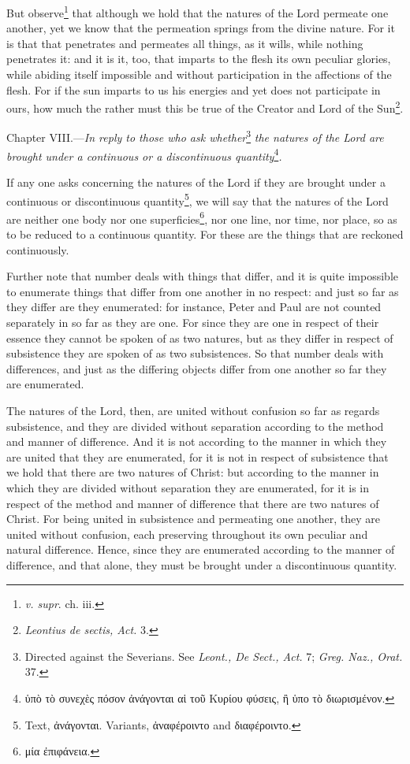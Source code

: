 But observe\footnote{\emph{v. supr}. ch. iii.} that although we hold that the natures of the Lord permeate one another, yet we know that the permeation springs from the divine nature. For it is that that penetrates and permeates all things, as it wills, while nothing penetrates it: and it is it, too, that imparts to the flesh its own peculiar glories, while abiding itself impossible and without participation in the affections of the flesh. For if the sun imparts to us his energies and yet does not participate in ours, how much the rather must this be true of the Creator and Lord of the Sun\footnote{\emph{Leontius de sectis, Act. }3.}.


Chapter VIII.—\emph{In reply to those who ask whether}\footnote{Directed against the Severians. See \emph{Leont., De Sect., Act. }7; \emph{Greg. Naz., Orat. }37.}\emph{ the natures of the Lord are brought under a continuous or a discontinuous quantity}\footnote{\textgreek{ὑπὸ τὸ συνεχὲς πόσον ἀνάγονται αἱ τοῦ Κυρίου φύσεις, ἢ ὑπο τὸ διωρισμένον}.}\emph{.}

If any one asks concerning the natures of the Lord if they are brought under a continuous or discontinuous quantity\footnote{Text, \textgreek{ἀνάγονται}. Variants, \textgreek{ἀναφέροιντο} and \textgreek{διαφέροιντο}.}, we will say that the natures of the Lord are neither one body nor one superficies\footnote{\textgreek{μία ἐπιφάνεια}.}, nor one line, nor time, nor place, so as to be reduced to a continuous quantity. For these are the things that are reckoned continuously.

Further note that number deals with things that differ, and it is quite impossible to enumerate things that differ from one another in no respect: and just so far as they differ are they enumerated: for instance, Peter and Paul are not counted separately in so far as they are one. For since they are one in respect of their essence they cannot be spoken of as two natures, but as they differ in respect of subsistence they are spoken of as two subsistences. So that number deals with differences, and just as the differing objects differ from one another so far they are enumerated.

The natures of the Lord, then, are united without confusion so far as regards subsistence, and they are divided without separation according to the method and manner of difference. And it is not according to the manner in which they are united that they are enumerated, for it is not in respect of subsistence that we hold that there are two natures of Christ: but according to the manner in which they are divided without separation they are enumerated, for it is in respect of the method and manner of difference that there are two natures of Christ. For being united in subsistence and permeating one another, they are united without confusion, each preserving throughout its own peculiar and natural difference. Hence, since they are enumerated according to the manner of difference, and that alone, they must be brought under a discontinuous quantity.

